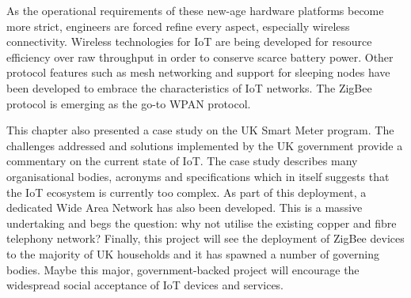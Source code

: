     As the operational requirements of these new-age hardware platforms become more strict, engineers are forced refine every aspect, especially wireless connectivity. Wireless technologies for IoT are being developed for resource efficiency over raw throughput in order to conserve scarce battery power. Other protocol features such as mesh networking and support for sleeping nodes have been developed to embrace the characteristics of IoT networks. The ZigBee protocol is emerging as the go-to WPAN protocol.

    This chapter also presented a case study on the UK Smart Meter program. The challenges addressed and solutions implemented by the UK government provide a commentary on the current state of IoT. The case study describes many organisational bodies, acronyms and specifications which in itself suggests that the IoT ecosystem is currently too complex. As part of this deployment, a dedicated Wide Area Network has also been developed. This is a massive undertaking and begs the question: why not utilise the existing copper and fibre telephony network? Finally, this project will see the deployment of ZigBee devices to the majority of UK households and it has spawned a number of governing bodies. Maybe this major, government-backed project will encourage the widespread social acceptance of IoT devices and services.

